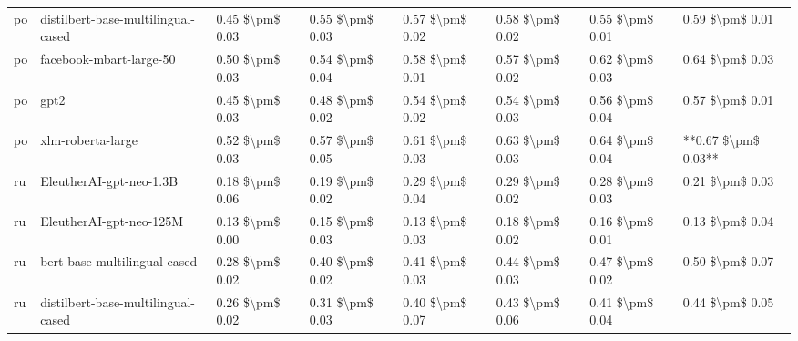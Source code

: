 \begin{tabular}{llllllll}
      po & distilbert-base-multilingual-cased & 0.45 \$\textbackslash pm\$ 0.03 &           0.55 \$\textbackslash pm\$ 0.03 &       0.57 \$\textbackslash pm\$ 0.02 &        0.58 \$\textbackslash pm\$ 0.02 &                         0.55 \$\textbackslash pm\$ 0.01 &     0.59 \$\textbackslash pm\$ 0.01 \\
      po &            facebook-mbart-large-50 & 0.50 \$\textbackslash pm\$ 0.03 &           0.54 \$\textbackslash pm\$ 0.04 &       0.58 \$\textbackslash pm\$ 0.01 &        0.57 \$\textbackslash pm\$ 0.02 &                         0.62 \$\textbackslash pm\$ 0.03 &     0.64 \$\textbackslash pm\$ 0.03 \\
      po &                               gpt2 & 0.45 \$\textbackslash pm\$ 0.03 &           0.48 \$\textbackslash pm\$ 0.02 &       0.54 \$\textbackslash pm\$ 0.02 &        0.54 \$\textbackslash pm\$ 0.03 &                         0.56 \$\textbackslash pm\$ 0.04 &     0.57 \$\textbackslash pm\$ 0.01 \\
      po &                  xlm-roberta-large & 0.52 \$\textbackslash pm\$ 0.03 &           0.57 \$\textbackslash pm\$ 0.05 &       0.61 \$\textbackslash pm\$ 0.03 &        0.63 \$\textbackslash pm\$ 0.03 &                         0.64 \$\textbackslash pm\$ 0.04 & **0.67 \$\textbackslash pm\$ 0.03** \\
      ru &            EleutherAI-gpt-neo-1.3B & 0.18 \$\textbackslash pm\$ 0.06 &           0.19 \$\textbackslash pm\$ 0.02 &       0.29 \$\textbackslash pm\$ 0.04 &        0.29 \$\textbackslash pm\$ 0.02 &                         0.28 \$\textbackslash pm\$ 0.03 &     0.21 \$\textbackslash pm\$ 0.03 \\
      ru &            EleutherAI-gpt-neo-125M & 0.13 \$\textbackslash pm\$ 0.00 &           0.15 \$\textbackslash pm\$ 0.03 &       0.13 \$\textbackslash pm\$ 0.03 &        0.18 \$\textbackslash pm\$ 0.02 &                         0.16 \$\textbackslash pm\$ 0.01 &     0.13 \$\textbackslash pm\$ 0.04 \\
      ru &       bert-base-multilingual-cased & 0.28 \$\textbackslash pm\$ 0.02 &           0.40 \$\textbackslash pm\$ 0.02 &       0.41 \$\textbackslash pm\$ 0.03 &        0.44 \$\textbackslash pm\$ 0.03 &                         0.47 \$\textbackslash pm\$ 0.02 &     0.50 \$\textbackslash pm\$ 0.07 \\
      ru & distilbert-base-multilingual-cased & 0.26 \$\textbackslash pm\$ 0.02 &           0.31 \$\textbackslash pm\$ 0.03 &       0.40 \$\textbackslash pm\$ 0.07 &        0.43 \$\textbackslash pm\$ 0.06 &                         0.41 \$\textbackslash pm\$ 0.04 &     0.44 \$\textbackslash pm\$ 0.05 \\

\end{tabular}
